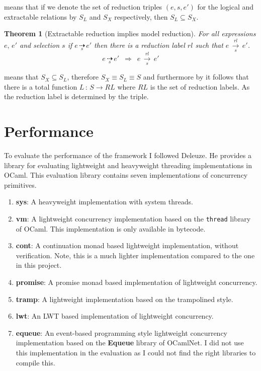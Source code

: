 \documentclass[12pt,twoside,notitlepage]{report}
\theoremstyle{plain}%
\newtheorem{thm}{Theorem}[section]
\theoremstyle{definition}
\theoremstyle{remark}
\begin{document}
 means that if we denote the set of reduction triples $ (e,s,e') $ for the logical and extractable relations by $ S_L $ and $ S_X $ respectively, then $ S_L \subseteq S_X $.

\begin{thm}[Extractable reduction implies model reduction]
\label{thm:xjo_to_jo}
For all expressions $ e,\,e' $ and selection $ s $ if $ e\, \underset{s}{\dashrightarrow}\, e' $ then there is a reduction label $ rl $ such that $ e\, \underset{s}{\overset{rl}{\longrightarrow}}\, e' $.
\[ e\, \underset{s}{\dashrightarrow}\, e' \,\,\,\Rightarrow \,\,\,  e\, \underset{s}{\overset{rl}{\longrightarrow}}\, e' \]
\end{thm}

 means that $ S_X \subseteq S_L $, therefore $ S_X \equiv S_L \equiv S $ and furthermore by  it follows that there is a total function $ L\,:\, S \rightarrow RL $ where $ RL $ is the set of reduction labels. As the reduction label is determined by the triple.

\section{Performance}
\label{sec:performance_eval}
To evaluate the performance of the framework I followed Deleuze\cite{deleuzelight}. He provides a library for evaluating lightweight and heavyweight threading implementations in OCaml. This evaluation library contains seven implementations of concurrency primitives.
\begin{enumerate}
\item{\textbf{sys}: A heavyweight implementation with system threads.}
\item{\textbf{vm}: A lightweight concurrency implementation based on the \verb|thread| library of OCaml. This implementation is only available in bytecode.}
\item{\textbf{cont}: A continuation monad based lightweight implementation\cite[p.~12-13]{deleuzelight}, without verification. Note, this is a much lighter implementation compared to the one in this project.}
\item{\textbf{promise}: A promise monad based implementation of lightweight concurrency\cite[p.~13-15]{deleuzelight}.}
\item{\textbf{tramp}: A lightweight implementation based on the trampolined style\cite[p.~11-12]{deleuzelight}.}
\item{\textbf{lwt}: An LWT\cite{LWT} based implementation of lightweight concurrency.}
\item{\textbf{equeue}: An event-based programming style lightweight concurrency implementation\cite[p.~15-18]{deleuzelight} based on the \textbf{Equeue} library of OCamlNet. I did not use this implementation in the evaluation as I could not find the right libraries to compile this.}
\end{enumerate}
\end{document}
